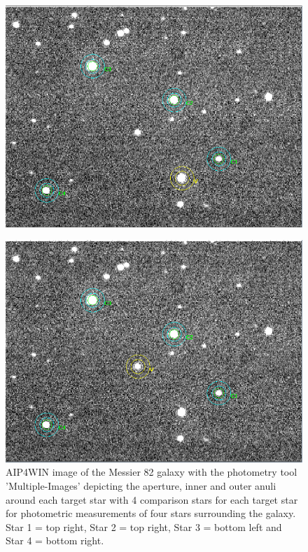 \documentclass[12pt]{article}
\begin{document}
\begin{figure}[H]
\begin{multicols}{2}
\begin{minipage}[H]{0.5\textwidth}
\includegraphics[scale=0.43]{Images/AsImages/MI/Sr2-Aperture.PNG} \\ 
\end{minipage}
\begin{minipage}[H]{0.5\textwidth}
\includegraphics[scale=0.43]{Images/AsImages/MI/Sr4-Aperture.PNG}
\end{minipage}
\end{multicols}
\caption{AIP4WIN image of the Messier 82 galaxy with the photometry tool 'Multiple-Images' depicting the aperture, inner and outer anuli around each target star with 4 comparison stars for each target star for photometric measurements of four stars surrounding the galaxy. Star 1 = top right, Star 2 = top right, Star 3 = bottom left and Star 4 = bottom right.}
\label{MI-Aperture}
\end{figure}
\end{document}
